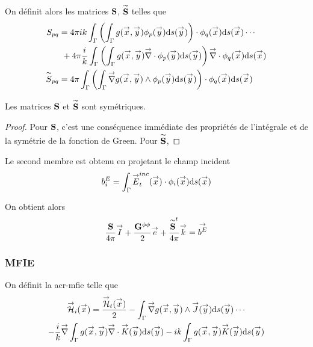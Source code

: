       On définit alors les matrices \(\mS\), \(\mSt\) telles que
      \begin{align}
        S_{pq} 
          &= 4\pi ik \int_\Gamma \left( \int_\Gamma g(\vx,\vy) \phi_p(\vy) \dd{s}(\vy) \right) \cdot \phi_q (\vx)\dd{s}(\vx) \cdots\\
          &~+ 4\pi \frac{i}{k}\int_\Gamma \left( \int_\Gamma g(\vx,\vy) \vdiv \phi_p (\vy) \dd{s}(\vy) \right) \vdiv \phi_q(\vx)\dd{s}(\vx)\\ 
        \tilde{S}_{pq}
          &= 4\pi \int_\Gamma \left( \int_\Gamma \vgrad g(\vx,\vy) \pvect \phi_p(\vy) \dd{s}(\vy) \right) \cdot \phi_q(\vx)\dd{s}(\vx)
      \end{align}

      \begin{prop}
        Les matrices \(\mS\) et \(\mSt\) sont symétriques.
      \end{prop}
      \begin{proof}
        Pour \(\mS\), c'est une conséquence immédiate des propriétés de l'intégrale et de la symétrie de la fonction de Green.
        Pour \(\mSt\), 
      \end{proof}

      Le second membre est obtenu en projetant le champ incident 
      \begin{equation}
        b_i^E = \int_\Gamma \vE^{inc}_t(\vx) \cdot \phi_i(\vx)\dd{s}(\vx)
      \end{equation}

      On obtient alors 
      \begin{equation}
        \frac{\mS}{4\pi}\vect{I}
        + \frac{\mG{\phi}{\phi}}{2}\vect{e}
        + \frac{\mSt^t}{4\pi}\vect{k}
        = \vect{b^E}
      \end{equation}
    
    \subsubsection{MFIE}
      On définit la \gls{acr-mfie} telle que
      \begin{multline}
        \label{eq:form_int:MFIE}
        \vH_i(\vx) = 
        \frac{\vH_t(\vx)}{2} 
          - \int_\Gamma \vgrad g(\vx,\vy) \pvect \vJ(\vy) \dd{s}(\vy) \cdots \\
        - \frac{i}{k} \vgrad \int_\Gamma  g(\vx,\vy)\vdiv\vK(\vy)\dd{s}(\vy) 
          - ik \int_\Gamma g(\vx,\vy)\vK(\vy)\dd{s}(\vy)
      \end{multline}
      
